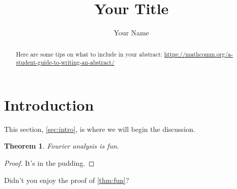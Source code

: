 \documentclass[12pt]{amsart}
\numberwithin{equation}{section} %
\theoremstyle{plain}
\newtheorem{theorem}[theorem]{Theorem}
\theoremstyle{definition}
\theoremstyle{remark}
\theoremstyle{plain}
\begin{document}
\title{Your Title}
\author{Your Name}


\begin{abstract}
Here are some tips on what to include in your abstract: \url{https://mathcomm.org/a-student-guide-to-writing-an-abstract/}
\end{abstract}

\maketitle

\setcounter{tocdepth}{1}
\tableofcontents

\section{Introduction}\label{sec:intro} %

This section, \autoref{sec:intro}, is where we will begin the discussion.

\begin{theorem}\label{thm:fun}
Fourier analysis is fun.
\end{theorem}
\begin{proof}
It's in the pudding.
\end{proof}

Didn't you enjoy the proof of \autoref{thm:fun}?


% 
\end{document}
